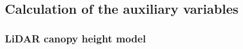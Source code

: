 

\subsection{Calculation of the auxiliary variables}
\label{sec:expvarcalc}

\subsubsection{LiDAR canopy height model}


